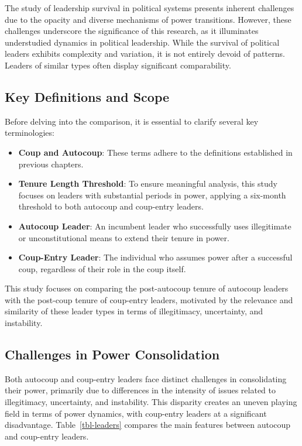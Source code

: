 \documentclass[
  12pt,
]{report}
\begin{document}
The study of leadership survival in political systems presents inherent
challenges due to the opacity and diverse mechanisms of power
transitions. However, these challenges underscore the significance of
this research, as it illuminates understudied dynamics in political
leadership. While the survival of political leaders exhibits complexity
and variation, it is not entirely devoid of patterns. Leaders of similar
types often display significant comparability.

\subsection{Key Definitions and Scope}\label{key-definitions-and-scope}

Before delving into the comparison, it is essential to clarify several
key terminologies:

\begin{itemize}
\item
  \textbf{Coup and Autocoup}: These terms adhere to the definitions
  established in previous chapters.
\item
  \textbf{Tenure Length Threshold}: To ensure meaningful analysis, this
  study focuses on leaders with substantial periods in power, applying a
  six-month threshold to both autocoup and coup-entry leaders.
\item
  \textbf{Autocoup Leader}: An incumbent leader who successfully uses
  illegitimate or unconstitutional means to extend their tenure in
  power.
\item
  \textbf{Coup-Entry Leader}: The individual who assumes power after a
  successful coup, regardless of their role in the coup itself.
\end{itemize}

This study focuses on comparing the post-autocoup tenure of autocoup
leaders with the post-coup tenure of coup-entry leaders, motivated by
the relevance and similarity of these leader types in terms of
illegitimacy, uncertainty, and instability.

\subsection{Challenges in Power
Consolidation}\label{challenges-in-power-consolidation}

Both autocoup and coup-entry leaders face distinct challenges in
consolidating their power, primarily due to differences in the intensity
of issues related to illegitimacy, uncertainty, and instability. This
disparity creates an uneven playing field in terms of power dynamics,
with coup-entry leaders at a significant disadvantage.
Table~\ref{tbl-leaders} compares the main features between autocoup and
coup-entry leaders.
\end{document}
